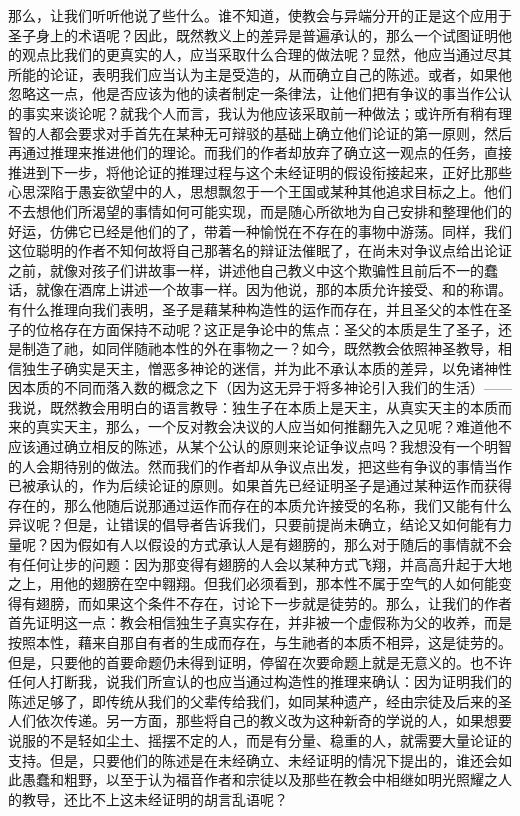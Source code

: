 那么，让我们听听他说了些什么。谁不知道，使教会与异端分开的正是这个应用于圣子身上的术语呢？因此，既然教义上的差异是普遍承认的，那么一个试图证明他的观点比我们的更真实的人，应当采取什么合理的做法呢？显然，他应当通过尽其所能的论证，表明我们应当认为主是受造的，从而确立自己的陈述。或者，如果他忽略这一点，他是否应该为他的读者制定一条律法，让他们把有争议的事当作公认的事实来谈论呢？就我个人而言，我认为他应该采取前一种做法；或许所有稍有理智的人都会要求对手首先在某种无可辩驳的基础上确立他们论证的第一原则，然后再通过推理来推进他们的理论。而我们的作者却放弃了确立这一观点的任务，直接推进到下一步，将他论证的推理过程与这个未经证明的假设衔接起来，正好比那些心思深陷于愚妄欲望中的人，思想飘忽于一个王国或某种其他追求目标之上。他们不去想他们所渴望的事情如何可能实现，而是随心所欲地为自己安排和整理他们的好运，仿佛它已经是他们的了，带着一种愉悦在不存在的事物中游荡。同样，我们这位聪明的作者不知何故将自己那著名的辩证法催眠了，在尚未对争议点给出论证之前，就像对孩子们讲故事一样，讲述他自己教义中这个欺骗性且前后不一的蠢话，就像在酒席上讲述一个故事一样。因为他说，那的本质允许接受、和的称谓。有什么推理向我们表明，圣子是藉某种构造性的运作而存在，并且圣父的本性在圣子的位格存在方面保持不动呢？这正是争论中的焦点：圣父的本质是生了圣子，还是制造了祂，如同伴随祂本性的外在事物之一？如今，既然教会依照神圣教导，相信独生子确实是天主，憎恶多神论的迷信，并为此不承认本质的差异，以免诸神性因本质的不同而落入数的概念之下（因为这无异于将多神论引入我们的生活）——我说，既然教会用明白的语言教导：独生子在本质上是天主，从真实天主的本质而来的真实天主，那么，一个反对教会决议的人应当如何推翻先入之见呢？难道他不应该通过确立相反的陈述，从某个公认的原则来论证争议点吗？我想没有一个明智的人会期待别的做法。然而我们的作者却从争议点出发，把这些有争议的事情当作已被承认的，作为后续论证的原则。如果首先已经证明圣子是通过某种运作而获得存在的，那么他随后说那通过运作而存在的本质允许接受的名称，我们又能有什么异议呢？但是，让错误的倡导者告诉我们，只要前提尚未确立，结论又如何能有力量呢？因为假如有人以假设的方式承认人是有翅膀的，那么对于随后的事情就不会有任何让步的问题：因为那变得有翅膀的人会以某种方式飞翔，并高高升起于大地之上，用他的翅膀在空中翱翔。但我们必须看到，那本性不属于空气的人如何能变得有翅膀，而如果这个条件不存在，讨论下一步就是徒劳的。那么，让我们的作者首先证明这一点：教会相信独生子真实存在，并非被一个虚假称为父的收养，而是按照本性，藉来自那自有者的生成而存在，与生祂者的本质不相异，这是徒劳的。但是，只要他的首要命题仍未得到证明，停留在次要命题上就是无意义的。也不许任何人打断我，说我们所宣认的也应当通过构造性的推理来确认：因为证明我们的陈述足够了，即传统从我们的父辈传给我们，如同某种遗产，经由宗徒及后来的圣人们依次传递。另一方面，那些将自己的教义改为这种新奇的学说的人，如果想要说服的不是轻如尘土、摇摆不定的人，而是有分量、稳重的人，就需要大量论证的支持。但是，只要他们的陈述是在未经确立、未经证明的情况下提出的，谁还会如此愚蠢和粗野，以至于认为福音作者和宗徒以及那些在教会中相继如明光照耀之人的教导，还比不上这未经证明的胡言乱语呢？\par

